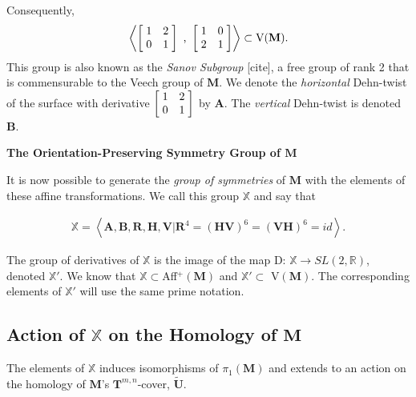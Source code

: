 \documentclass[]{article}
\begin{document}
Consequently, 
\begin{equation}
\left< \left[ \hspace{1mm} \begin{matrix}
				1 &  2\\
				0 & 1
			\end{matrix}\hspace{1mm}\right] \text{ , }
			\left[ \hspace{1mm} \begin{matrix}
							1 & 0\\
							 2 & 1
						\end{matrix}\hspace{1mm}\right] \right>
						\subset \text{V}(\mathbf M).
\end{equation}
This group is also known as the \emph{Sanov Subgroup} [cite], a free group of rank 2 that is commensurable to the Veech group of $\mathbf M$. We denote the \emph{horizontal} Dehn-twist of the surface with derivative $\left[ \hspace{1mm} \begin{matrix}
				1 &  2\\
				0 & 1
			\end{matrix}\hspace{1mm}\right]$ by $\textbf{A}$. The \emph{vertical} Dehn-twist is denoted $\mathbf{B}$.
			
\vspace{0.1in}

\noindent\textbf{The Orientation-Preserving Symmetry Group of $\textbf{M}$}

It is now possible to generate the \emph{group of symmetries} of $\textbf{M}$ with the elements of these affine transformations. We call this group $\mathbb X$ and say that 

\begin{align}
\mathbb X= \left< \mathbf{A},\mathbf{B},\mathbf{R},\mathbf{H},\mathbf{V}\vert\mathbf{R}^4 = (\mathbf{H}\mathbf{V})^{6}=(\mathbf{V}\mathbf{H})^{6}=id  \right>.
\end{align}

The group of derivatives of $\mathbb X$ is the image of the map D: $\mathbb X\rightarrow SL(2,\mathbb{R})$, denoted $\mathbb X'$. We know that $\mathbb{X}\subset$Aff$^+(\mathbf{M})$ and $\mathbb X'\subset$ V$(\mathbf{M})$. The corresponding elements of $\mathbb X'$ will use the same prime notation.

\subsection{Action of $\mathbb X$ on the Homology of $\mathbf M$}
The elements of $\mathbb X$ induces isomorphisms of $\pi_1(\mathbf{M})$ and extends to an action on the homology of $\mathbf{M}$'s $\mathbf{T}^{m,n}$-cover, $\tilde{\mathbf{U}}$.
\end{document}
